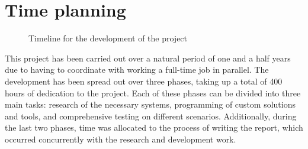 \section{Time planning}
\label{sec:time-planning}

\begin{figure}
  \centering
  \caption{Timeline for the development of the project}
  \label{fig:project-timeline}
\end{figure}

This project has been carried out over a natural period of one and a half years due to having to coordinate with working a full-time job in parallel.
The development has been spread out over three phases, taking up a total of 400 hours of dedication to the project.
Each of these phases can be divided into three main tasks: research of the necessary systems, programming of custom solutions and tools, and comprehensive testing on different scenarios.
Additionally, during the last two phases, time was allocated to the process of writing the report, which occurred concurrently with the research and development work.


